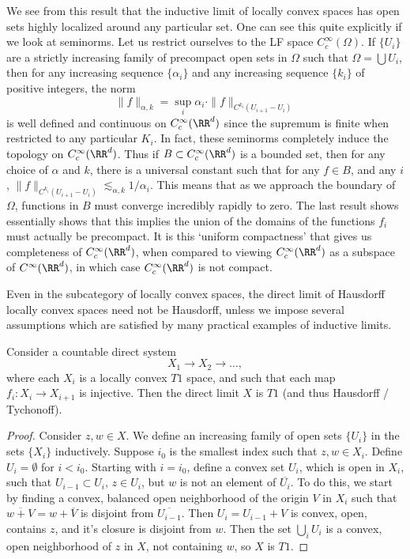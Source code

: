 \begin{remark}
    We see from this result that the inductive limit of locally convex spaces has open sets highly localized around any particular set. One can see this quite explicitly if we look at seminorms. Let us restrict ourselves to the LF space $C_c^\infty(\Omega)$. If $\{ U_i \}$ are a strictly increasing family of precompact open sets in $\Omega$ such that $\Omega = \bigcup U_i$, then for any increasing sequence $\{ \alpha_i \}$ and any increasing sequence $\{ k_i \}$ of positive integers, the norm
    \[ \| f \|_{\alpha,k} = \sup_i \alpha_i \cdot \| f \|_{C^{k_i}(U_{i+1} - U_i)} \]
    is well defined and continuous on $C_c^\infty(\RR^d)$ since the supremum is finite when restricted to any particular $K_i$. In fact, these seminorms completely induce the topology on $C_c^\infty(\RR^d)$. Thus if $B \subset C_c^\infty(\RR^d)$ is a bounded set, then for any choice of $\alpha$ and $k$, there is a universal constant such that for any $f \in B$, and any $i$, $\| f \|_{C^{k_i}(U_{i+1} - U_i)} \lesssim_{\alpha,k} 1/\alpha_i$. This means that as we approach the boundary of $\Omega$, functions in $B$ must converge incredibly rapidly to zero. The last result shows essentially shows that this implies the union of the domains of the functions $f_i$ must actually be precompact. It is this `uniform compactness' that gives us completeness of $C_c^\infty(\RR^d)$, when compared to viewing $C_c^\infty(\RR^d)$ as a subspace of $C^\infty(\RR^d)$, in which case $C_c^\infty(\RR^d)$ is not compact.
\end{remark}

Even in the subcategory of locally convex spaces, the direct limit of Hausdorff locally convex spaces need not be Hausdorff, unless we impose several assumptions which are satisfied by many practical examples of inductive limits.

\begin{lemma}
    Consider a countable direct system
    \[ X_1 \to X_2 \to \dots, \]
    where each $X_i$ is a locally convex $T1$ space, and such that each map $f_i: X_i \to X_{i+1}$ is injective. Then the direct limit $X$ is $T1$ (and thus Hausdorff / Tychonoff).
\end{lemma}
\begin{proof}
    Consider $z,w \in X$. We define an increasing family of open sets $\{ U_i \}$ in the sets $\{ X_i \}$ inductively. Suppose $i_0$ is the smallest index such that $z,w \in X_i$. Define $U_i = \emptyset$ for $i < i_0$. Starting with $i = i_0$, define a convex set $U_i$, which is open in $X_i$, such that $U_{i-1} \subset U_i$, $z \in U_i$, but $w$ is not an element of $\overline{U_i}$. To do this, we start by finding a convex, balanced open neighborhood of the origin $V$ in $X_i$ such that $\overline{w + V} = w + \overline{V}$ is disjoint from $\overline{U_{i-1}}$. Then $U_i = U_{i-1} + V$ is convex, open, contains $z$, and it's closure is disjoint from $w$. Then the set $\bigcup_i U_i$ is a convex, open neighborhood of $z$ in $X$, not containing $w$, so $X$ is $T1$.
\end{proof}

